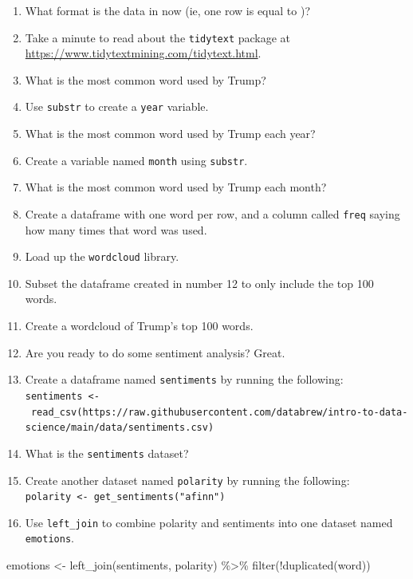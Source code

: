 \documentclass[
]{book}
\newenvironment{Shaded}{\begin{snugshade}}{\end{snugshade}}
\newcommand{\FunctionTok}[1]{\textcolor[rgb]{0.00,0.00,0.00}{#1}}
\newcommand{\NormalTok}[1]{#1}
\newcommand{\OtherTok}[1]{\textcolor[rgb]{0.56,0.35,0.01}{#1}}
\newcommand{\SpecialCharTok}[1]{\textcolor[rgb]{0.00,0.00,0.00}{#1}}
\begin{document}
\begin{enumerate}
\def\labelenumi{\arabic{enumi}.}
\setcounter{enumi}{4}
\item
  What format is the data in now (ie, one row is equal to )?
\item
  Take a minute to read about the \texttt{tidytext} package at \url{https://www.tidytextmining.com/tidytext.html}.
\item
  What is the most common word used by Trump?
\item
  Use \texttt{substr} to create a \texttt{year} variable.
\item
  What is the most common word used by Trump each year?
\item
  Create a variable named \texttt{month} using \texttt{substr}.
\item
  What is the most common word used by Trump each month?
\item
  Create a dataframe with one word per row, and a column called \texttt{freq} saying how many times that word was used.
\item
  Load up the \texttt{wordcloud} library.
\item
  Subset the dataframe created in number 12 to only include the top 100 words.
\item
  Create a wordcloud of Trump's top 100 words.
\item
  Are you ready to do some sentiment analysis? Great.
\item
  Create a dataframe named \texttt{sentiments} by running the following: \texttt{sentiments\ \textless{}-\ read\_csv(\textquotesingle{}https://raw.githubusercontent.com/databrew/intro-to-data-science/main/data/sentiments.csv\textquotesingle{})}
\item
  What is the \texttt{sentiments} dataset?
\item
  Create another dataset named \texttt{polarity} by running the following: \texttt{polarity\ \textless{}-\ get\_sentiments("afinn")}
\item
  Use \texttt{left\_join} to combine polarity and sentiments into one dataset named \texttt{emotions}.
\end{enumerate}

\begin{Shaded}
\begin{Highlighting}[]
\NormalTok{emotions }\OtherTok{\textless{}{-}} \FunctionTok{left\_join}\NormalTok{(sentiments, polarity) }\SpecialCharTok{\%\textgreater{}\%} \FunctionTok{filter}\NormalTok{(}\SpecialCharTok{!}\FunctionTok{duplicated}\NormalTok{(word))}
\end{Highlighting}
\end{Shaded}
\end{document}

